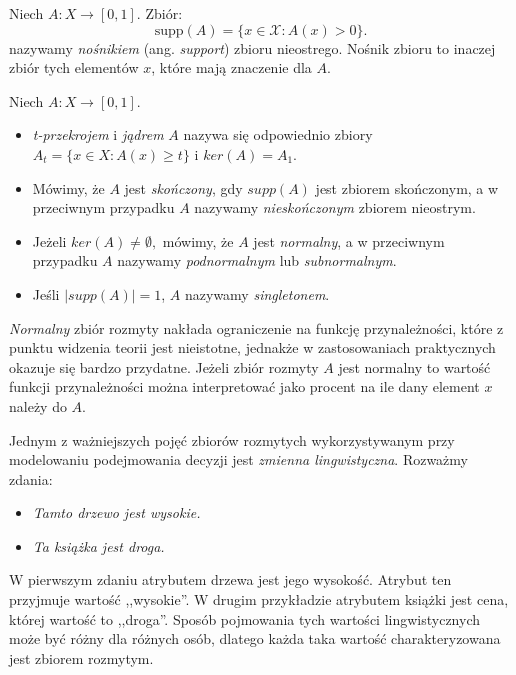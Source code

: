 \begin{definition} Niech $A : X \rightarrow [0,1].$ Zbiór:
\begin{equation}
  \mathrm{supp}(A) = \{ x \in \mathcal{X} : A(x) > 0 \}.
\end{equation}
nazywamy \emph{nośnikiem} (ang. \textit{support}) zbioru nieostrego.
Nośnik zbioru to inaczej zbiór tych elementów $x$, które mają znaczenie dla $A$.  
\end{definition}

\begin{definition}
Niech $A : X \rightarrow [0,1]$.
\begin{itemize}
  \item \emph{t-przekrojem} i \emph{jądrem} $A$ nazywa się odpowiednio zbiory
  \newline $A_t = \{ x \in X : A(x) \geq t \}$ i $ker(A) = A_1$.
  \item Mówimy, że $A$ jest \emph{skończony}, gdy $supp(A)$ jest zbiorem
  skończonym, a w przeciwnym przypadku $A$ nazywamy \emph{nieskończonym} zbiorem
  nieostrym.
  \item Jeżeli $ker(A) \neq \emptyset,$ mówimy, że $A$ jest \emph{normalny}, a w
  przeciwnym przypadku $A$ nazywamy \emph{podnormalnym} lub \emph{subnormalnym}.
  \item Jeśli $|supp(A)| = 1$, $A$ nazywamy \emph{singletonem}.
\end{itemize}
\end{definition}

\emph{Normalny} zbiór rozmyty nakłada ograniczenie na funkcję przynależności,
które z punktu widzenia teorii jest nieistotne, jednakże w zastosowaniach
praktycznych okazuje się bardzo przydatne. Jeżeli zbiór rozmyty $A$ jest
normalny to wartość funkcji przynależności można interpretować jako procent na
ile dany element $x$ należy do $A$.

Jednym z ważniejszych pojęć zbiorów rozmytych wykorzystywanym przy modelowaniu
podejmowania decyzji jest \emph{zmienna lingwistyczna}. Rozważmy zdania:
\begin{itemize}
  \item[] \emph{Tamto drzewo jest wysokie.}
  \item[] \emph{Ta książka jest droga.}
\end{itemize}

W pierwszym zdaniu atrybutem drzewa jest jego wysokość. Atrybut ten przyjmuje
wartość ,,wysokie''. W drugim przykładzie atrybutem książki jest cena, której
wartość to ,,droga''. Sposób pojmowania tych wartości lingwistycznych może być
różny dla różnych osób, dlatego każda taka wartość charakteryzowana jest zbiorem
rozmytym.

